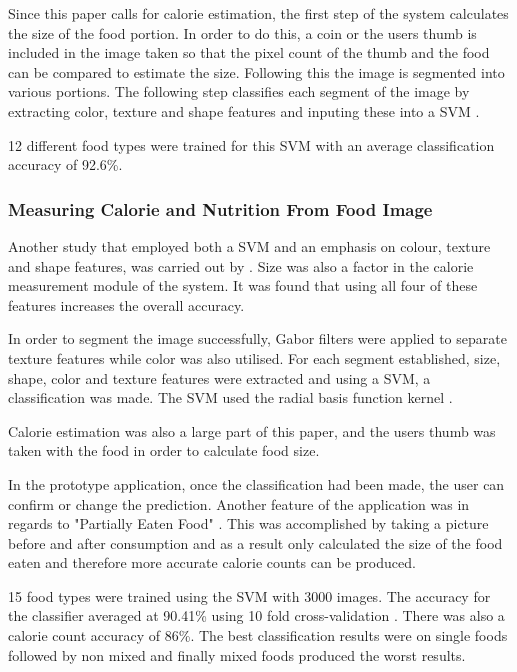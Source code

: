 Since this paper calls for calorie estimation, the first step of the system calculates the size of the food portion. In order to do this, a coin or the users thumb is included in the image taken so that the pixel count of the thumb and the food can be compared to estimate the size. Following this the image is segmented into various portions. The following step classifies each segment of the image by extracting color, texture and shape features and inputing these into a SVM \textcite{novelSVM}.

12 different food types were trained for this SVM with an average classification accuracy of 92.6\%.

\subsubsection*{Measuring Calorie and Nutrition From Food Image}
Another study that employed both a SVM and an emphasis on colour, texture and shape features, was carried out by \textcite{pouladzadeh2014measuring}. Size was also a factor in the calorie measurement module of the system. It was found that using all four of these features increases the overall accuracy.

In order to segment the image successfully, Gabor filters were applied to separate texture features while color was also utilised. For each segment established, size, shape, color and texture features were extracted and using a SVM, a classification was made. The SVM used the radial basis function kernel \textcite{pouladzadeh2014measuring}.

Calorie estimation was also a large part of this paper, and the users thumb was taken with the food in order to calculate food size.

In the prototype application, once the classification had been made, the user can confirm or change the prediction. Another feature of the application was in regards to "Partially Eaten Food" \textcite{pouladzadeh2014measuring}. This was accomplished by taking a picture before and after consumption and as a result only calculated the size of the food eaten and therefore more accurate calorie counts can be produced.

15 food types were trained using the SVM with 3000 images. The accuracy for the classifier averaged at 90.41\% using 10 fold cross-validation \textcite{pouladzadeh2014measuring}. There was also a calorie count accuracy of 86\%. The best classification results were on single foods followed by non mixed and finally mixed foods produced the worst results.

